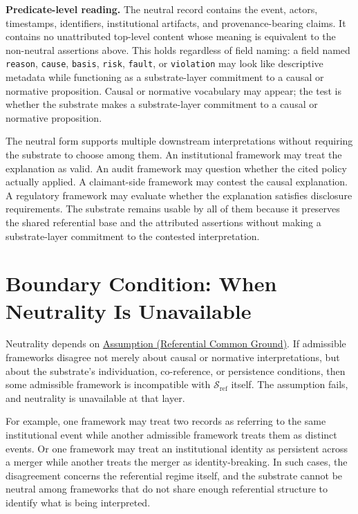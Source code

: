 \documentclass[11pt]{article}
\theoremstyle{plain}
\theoremstyle{definition}
\theoremstyle{remark}
\newcommand{\AssumpRef}[2]{\hyperref[#1]{Assumption (#2)}}
\newcommand{\SubstrateRef}{\mathcal{S}_{\mathrm{ref}}}
\begin{document}
\textbf{Predicate-level reading.} The neutral record contains the event,
actors, timestamps, identifiers, institutional artifacts, and
provenance-bearing claims.
It contains no unattributed top-level content whose
meaning is equivalent to the non-neutral assertions above.
This holds regardless of field naming:
a field named \texttt{reason}, \texttt{cause},
\texttt{basis}, \texttt{risk}, \texttt{fault}, or \texttt{violation}
may look like descriptive metadata
while functioning as a substrate-layer
commitment to a causal or normative proposition.
Causal or normative vocabulary may appear;
the test is whether the substrate makes a substrate-layer commitment
to a causal or normative proposition.

The neutral form supports
multiple downstream interpretations without
requiring the substrate to choose among them.
An institutional framework may treat the explanation as valid.
An audit framework may question whether the cited policy actually applied.
A claimant-side framework may contest the causal explanation.
A regulatory framework may evaluate whether the explanation satisfies disclosure requirements.
The substrate remains usable by all of them
because it preserves the shared referential base and the attributed assertions
without making a substrate-layer commitment
to the contested interpretation.

\section{Boundary Condition: When Neutrality Is Unavailable}
\label{sec:boundary}

Neutrality depends on
\AssumpRef{se100.def.ReferentialCommonGround}{Referential Common Ground}.
If admissible frameworks disagree not merely about causal or normative
interpretations, but about the substrate's individuation, co-reference, or
persistence conditions,
then some admissible framework is incompatible with $\SubstrateRef$ itself.
The assumption fails, and neutrality is unavailable at that layer.

For example, one framework may treat two records as referring to the same
institutional event while another admissible framework treats them as distinct
events. Or one framework may treat an institutional identity as persistent
across a merger while another treats the merger as identity-breaking.
In such cases, the disagreement concerns the referential regime itself, and the
substrate cannot be neutral among frameworks that do not share enough
referential structure to identify what is being interpreted.
\end{document}
